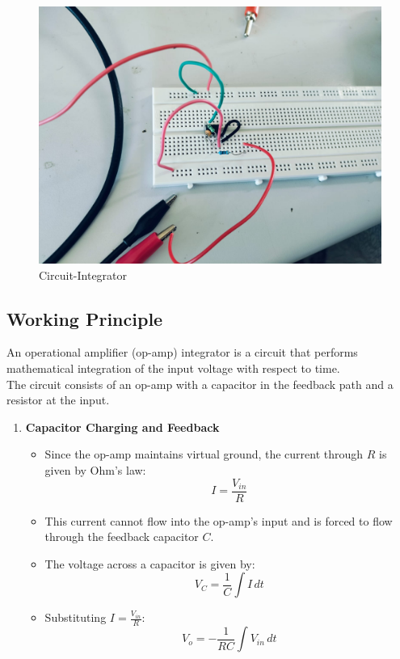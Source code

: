 \documentclass[a4paper,12pt]{article}
\begin{document}
\begin{figure}
    \centering
    \includegraphics[width=0.5\linewidth]{fig/c2.jpeg}
    \caption{Circuit-Integrator}
    \label{fig:enter-label}
\end{figure}

\subsection{Working Principle}
An operational amplifier (op-amp) integrator is a circuit that performs mathematical integration of the input voltage with respect to time. \\The circuit consists of an op-amp with a capacitor in the feedback path and a resistor at the input. 
\begin{enumerate}
   
    \item \textbf{Capacitor Charging and Feedback}
    \begin{itemize}
        \item Since the op-amp maintains virtual ground, the current through $R$ is given by Ohm’s law:
        \[
        I = \frac{V_{in}}{R}
        \]
        \item This current cannot flow into the op-amp’s input and is forced to flow through the feedback capacitor $C$.
        \item The voltage across a capacitor is given by:
        \[
        V_C = \frac{1}{C} \int I \, dt
        \]
        \item Substituting $I = \frac{V_{in}}{R}$:
        \[
        V_o = - \frac{1}{RC} \int V_{in} \, dt
        \]
    \end{itemize}

   
\end{enumerate}
\end{document}
